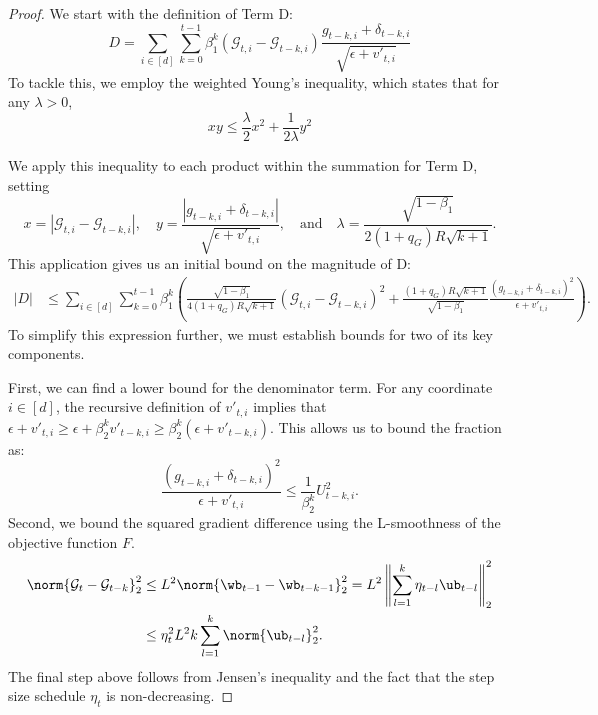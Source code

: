 \documentclass[11pt, letterpaper]{article}
\begin{document}
\begin{proof}
We start with the definition of Term D:
$$D = \sum_{i \in [d]} \sum_{k=0}^{t-1} \beta_1^k \left(\mathcal{G}_{t, i} - \mathcal{G}_{t -k, i}\right) \frac{g_{t - k, i}+\delta_{t-k,i}}{\sqrt{\epsilon+v'_{t, i}}}$$
To tackle this, we employ the weighted Young's inequality, which states that for any $\lambda > 0$,
\begin{equation}
    xy \leq \frac{\lambda}{2}x^2 + \frac{1}{2\lambda}y^2
    \label{eq:square_bound_lemmaD}
\end{equation}

We apply this inequality to each product within the summation for Term D, setting
\begin{equation*}
x = |{\mathcal{G}_{t, i} - \mathcal{G}_{t -k, i}}|, \quad
y = \frac{|{g_{t -k, i}+\delta_{t-k,i}}|}{\sqrt{\epsilon+v'_{t,i}}}, \quad \text{and} \quad
\lambda = \frac{\sqrt{1 - \beta_1}}{2 (1+q_G)R \sqrt{k + 1}}.
\end{equation*}
This application gives us an initial bound on the magnitude of D:
\begin{align}
|D| &\leq \sum_{i \in [d]} \sum_{k=0}^{t-1} \beta_1^k \left(
\frac{\sqrt{1 - \beta_1}}{4 (1+q_G)R \sqrt{k + 1}}\left(\mathcal{G}_{t, i} - \mathcal{G}_{t -k, i}\right)^2 + \frac{(1+q_G)R\sqrt{k+1}}{\sqrt{1-\beta_1}}\frac{(g_{t -k, i}+\delta_{t-k,i})^2}{\epsilon + v'_{t, i}}
\right).
\label{eq:d_bound_young_lemmaD}
\end{align}
To simplify this expression further, we must establish bounds for two of its key components.

First, we can find a lower bound for the denominator term. For any coordinate $i \in [d]$, the recursive definition of $v'_{t,i}$ implies that $\epsilon + v'_{t, i} \geq \epsilon + \beta_2^{k} v'_{t -k, i} \geq \beta_2^{k} (\epsilon + v'_{t-k, i})$. This allows us to bound the fraction as:
\begin{equation}
\label{eq:v_prime_bound_lemmaD}
\frac{(g_{t - k, i}+\delta_{t-k,i})^2}{\epsilon + v'_{t,i}} \leq \frac{1}{\beta_2^k}U_{t -k, i}^2.
\end{equation}
Second, we bound the squared gradient difference using the L-smoothness of the objective function $F$.
\begin{align}
\norm{\mathcal{G}_{t} - \mathcal{G}_{t -k}}_2^2 &\leq L^2 \norm{\wb_{t - 1} - \wb_{t - k - 1}}_2^2 = L^2 \left\| \sum_{l=1}^{k} \eta_{t -l} \ub_{t - l} \right\|_2^2 \nonumber \\
&\leq \eta_t^2 L^2 k \sum_{l=1}^{k} \norm{\ub_{t-l}}^2_2.
\label{eq:grad_diff_bound_lemmaD}
\end{align}
The final step above follows from Jensen's inequality and the fact that the step size schedule $\eta_t$ is non-decreasing.


\end{proof}
\end{document}

